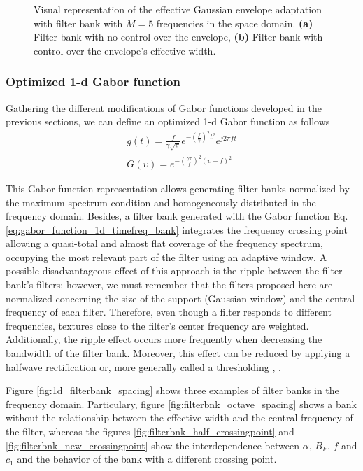 \documentclass[journal]{IEEEtran}
\newcommand{\captext}[1]{\small{\textbf{\textsf{#1}}}}
\begin{document}
\begin{figure}[!ht]
  \caption{Visual representation of the effective Gaussian envelope adaptation with filter bank with $M = 5$ frequencies in the space domain. \captext{(a)} Filter bank with no control over the envelope, \captext{(b)} Filter bank with control over the envelope's effective width.}
  \label{fig:1D_space_Gaborfilterbank}
\end{figure}


\subsubsection{Optimized 1-d Gabor function}
Gathering the different modifications of Gabor functions developed in the previous sections, we can define an optimized 1-d Gabor function as follows
\begin{equation}\label{eq:gabor_function_1d_timefreq_bank}
    \begin{gathered}
         g(t) =  \frac{f}{\gamma \sqrt{\pi}} e ^{-\left(\frac{f}{\gamma}\right)^2 t^2} e ^{j 2 \pi f t } \\
         G(\upsilon) =  e ^{-\left(\frac{\gamma \pi}{f}\right) ^2 (\upsilon-f)^2}
     \end{gathered}
\end{equation}

This Gabor function representation allows generating filter banks normalized by the maximum spectrum condition and homogeneously distributed in the frequency domain. Besides, a filter bank generated with the Gabor function Eq. \eqref{eq:gabor_function_1d_timefreq_bank} integrates the frequency crossing point allowing a quasi-total and almost flat coverage of the frequency spectrum, occupying the most relevant part of the filter using an adaptive window. A possible disadvantageous effect of this approach is the ripple between the filter bank's filters; however, we must remember that the filters proposed here are normalized concerning the size of the support (Gaussian window) and the central frequency of each filter. Therefore, even though a filter responds to different frequencies, textures close to the filter's center frequency are weighted. Additionally, the ripple effect occurs more frequently when decreasing the bandwidth of the filter bank. Moreover, this effect can be reduced by applying a halfwave rectification or, more generally called a thresholding \cite{Petkov:FGCS:1995}, \cite{Grigorescu.Petkov.ea:TIP:2003} \cite{Kruizinga.Petkov:TIP:1999}.

Figure \ref{fig:1d_filterbank_spacing} shows three examples of filter banks in the frequency domain.  Particulary, figure \ref{fig:filterbnk_octave_spacing} shows a bank without the relationship between the effective width and the central frequency of the filter, whereas the figures \ref{fig:filterbnk_half_crossingpoint} and \ref{fig:filterbnk_new_crossingpoint} show the interdependence between $\alpha$, $B_F$, $f$ and $c_1$ and the behavior of the bank with a different crossing point.
\end{document}
